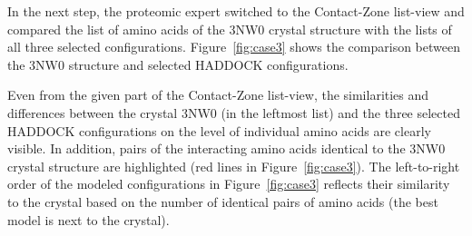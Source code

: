 \documentclass{bmcart}
\def\MatView {Matrix view\xspace}
\def\CoZoListView {Contact-Zone list-view\xspace}
\begin{document}

In the next step, the proteomic expert switched to the \CoZoListView and compared the list of amino acids of the 3NW0 crystal structure with the lists of all three selected configurations.
Figure~\ref{fig:case3} shows the comparison between the 3NW0 structure and selected HADDOCK configurations.

Even from the given part of the \CoZoListView, the similarities and differences between the crystal 3NW0 (in the leftmost list) and the three selected HADDOCK configurations on the level of individual amino acids are clearly visible.
In addition, pairs of the interacting amino acids identical to the 3NW0 crystal structure are highlighted (red lines in Figure~\ref{fig:case3}). 
The left-to-right order of the modeled configurations in Figure~\ref{fig:case3} reflects their similarity to the crystal based on the number of identical pairs of amino acids (the best model is next to the crystal).


\end{document}
